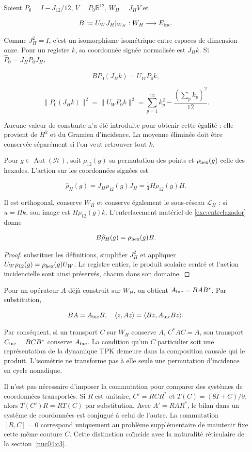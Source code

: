 Soient \(P_0=I-J_{12}/12\), \(V=P_0\mathbb R^{12}\), \(W_H=J_HV\) et

\[
B:=U_WJ_H|_{W_H}:W_H\longrightarrow E_{\rm inc}.
\]

Comme \(J_H^2=I\), c’est un isomorphisme isométrique entre espaces de dimension onze. Pour un registre \(k\), sa coordonnée signée normalisée est \(J_Hk\). Si \(\widehat P_0=J_HP_0J_H\),

\[
B\widehat P_0(J_Hk)=U_WP_0k,
\]

\[
\|\widehat P_0(J_Hk)\|^2
=\|U_WP_0k\|^2
=\sum_{p=1}^{12}k_p^2-\frac{(\sum_pk_p)^2}{12}.
\]

Aucune valeur de constante n’a été introduite pour obtenir cette égalité : elle provient de \(H^2\) et du Gramien d’incidence. La moyenne éliminée doit être conservée séparément si l’on veut retrouver tout \(k\).

Pour \(g\in\operatorname{Aut}(\mathcal H)\), soit \(\rho_{12}(g)\) sa permutation des points et \(\rho_{\rm hex}(g)\) celle des hexades. L’action sur les coordonnées signées est

\[
\widehat\rho_H(g)=J_H\rho_{12}(g)J_H
=\tfrac14H\rho_{12}(g)H.
\]

Il est orthogonal, conserve \(W_H\) et conserve également le sous-réseau \(\mathcal L_H\) : si \(u=Hk\), son image est \(H\rho_{12}(g)k\). L’entrelacement matériel de \cref{exc:entrelazador} donne


\[
B\widehat\rho_H(g)=\rho_{\rm hex}(g)B.
\]

\begin{proof}
substituer les définitions, simplifier \(J_H^2\) et appliquer \(U_W\rho_{12}(g)=\rho_{\rm hex}(g)U_W\). Le registre entier, le produit scalaire centré et l’action incidencielle sont ainsi préservés, chacun dans son domaine.
\end{proof}

Pour un opérateur \(A\) déjà construit sur \(W_H\), on obtient \(A_{\rm inc}=BAB^*\). Par substitution,

\[
BA=A_{\rm inc}B,\quad
\langle z,Az\rangle=\langle Bz,A_{\rm inc}Bz\rangle.
\]

Par conséquent, si un transport \(C\) sur \(W_H\) conserve \(A\), \(C^*AC=A\), son transport \(C_{\rm inc}=BCB^*\) conserve \(A_{\rm inc}\). La condition qu’un \(C\) particulier soit une représentation de la dynamique TPK demeure dans la composition causale qui le produit. L’isométrie ne transforme pas à elle seule une permutation d’incidence en cycle nonadique.

Il n’est pas nécessaire d’imposer la commutation pour comparer des systèmes de coordonnées transportés. Si \(R\) est unitaire, \(C'=RCR^*\) et \(T(C)=(8I+C)/9\), alors \(T(C')R=RT(C)\) par substitution. Avec \(A'=RAR^*\), le bilan dans un système de coordonnées est conjugué à celui de l’autre. La commutation \([R,C]=0\) correspond uniquement au problème supplémentaire de maintenir fixe cette même couture \(C\). Cette distinction coïncide avec la naturalité réticulaire de la section~\ref{nuc04:c3}.


